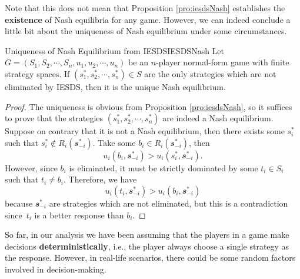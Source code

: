 \documentclass[math]{amznotes}
\theoremstyle{remark}
\begin{document}
Note that this does not mean that Proposition \ref{pro:iesdsNash} establishes the \textbf{existence} of Nash equilibria for any game. However, we can indeed conclude a little bit about the uniqueness of Nash equilibrium under some circumstances.
\begin{probox}{Uniqueness of Nash Equilibrium from IESDS}{IESDSNash}
    Let $G = \left(S_1, S_2, \cdots, S_n, u_1, u_2, \cdots, u_n\right)$ be an $n$-player normal-form game with finite strategy spaces. If $\left(s_1^*, s_2^*, \cdots, s_n^*\right) \in S$ are the only strategies which are not eliminated by IESDS, then it is the unique Nash equilibrium.
    \tcblower
    \begin{proof}
        The uniqueness is obvious from Proposition \ref{pro:iesdsNash}, so it suffices to prove that the strategies $\left(s_1^*, s_2^*, \cdots, s_n^*\right)$ are indeed a Nash equilibrium. Suppose on contrary that it is not a Nash equilibrium, then there exists some $s_i^*$ such that $s_i^* \notin R_i\left(\mathbfit{s}_{-i}^*\right)$. Take some $b_i \in R_i\left(\mathbfit{s}_{-i}^*\right)$, then 
        \begin{equation*}
            u_i\left(b_i, \mathbfit{s}_{-i}^*\right) > u_i\left(s_i^*, \mathbfit{s}_{-i}^*\right).
        \end{equation*}
        However, since $b_i$ is eliminated, it must be strictly dominated by some $t_i \in S_i$ such that $t_i \neq b_i$. Therefore, we have 
        \begin{equation*}
            u_i\left(t_i, \mathbfit{s}_{-i}^*\right) > u_i\left(b_i, \mathbfit{s}_{-i}^*\right)
        \end{equation*}
        because $\mathbfit{s}_{-i}^*$ are strategies which are not eliminated, but this is a contradiction since~$t_i$ is a better response than $b_i$.
    \end{proof}
\end{probox}
So far, in our analysis we have been assuming that the players in a game make decisions \textbf{deterministically}, i.e., the player always choose a single strategy as the response. However, in real-life scenarios, there could be some random factors involved in decision-making. 
\end{document}
